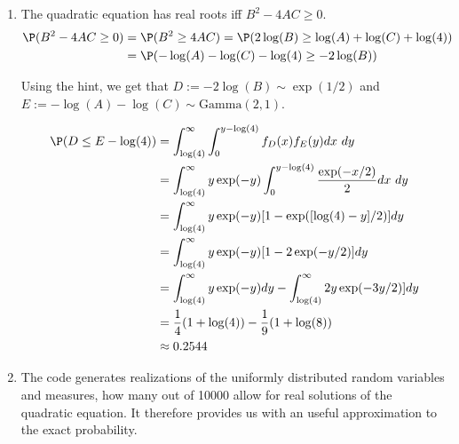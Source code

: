\begin{solution}

\phantom{}

\begin{enumerate}[label = (\alph*)]
  \item The quadratic equation has real roots iff $B^2 - 4AC \geq 0$.
  \begin{align*}
    \P(B^2 - 4AC \geq 0) &= \P(B^2 \geq 4AC) = \P(2\log(B) \geq \log(A) + \log(C) + \log(4)) \\
    &= \P(- \log(A) - \log(C) - \log(4) \geq -2\log(B))
  \end{align*}

  Using the hint, we get that $D := -2\log(B) \sim \exp(1/2)$ and $E := -\log(A) - \log(C) \sim \text{Gamma}(2,1)$.

  \begin{align*}
    \P(D \leq E - \log(4)) &= \int_{\log(4)}^\infty\int_0^{y - \log(4)} f_D(x)f_E(y) dx\ dy \\
    &= \int_{\log(4)}^\infty y\exp(-y)\int_0^{y - \log(4)} \frac{\exp(-x/2)}{2}  dx\ dy \\
    &= \int_{\log(4)}^\infty y\exp(-y)[1 - \exp([\log(4) - y]/ 2)] dy \\
    &= \int_{\log(4)}^\infty y\exp(-y)[1 - 2\exp(-y/2)] dy \\
    &= \int_{\log(4)}^\infty y\exp(-y) dy -  \int_{\log(4)}^\infty 2y\exp(-3y/2)] dy\\
    &= \frac{1}{4}(1 + \log(4)) - \frac{1}{9}(1 + \log(8)) \\
    &\approx 0.2544
  \end{align*}

  \item The code generates realizations of the uniformly distributed
  random variables and measures, how many out of 10000 allow for real
  solutions of the quadratic equation. It therefore provides us
  with an useful approximation to the exact probability.
\end{enumerate}

\end{solution}

